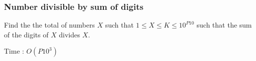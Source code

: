 \subsubsection{Number divisible by sum of digits}

Find the the total of numbers $X$ such that $1 \leq X \leq K \leq 10^{P10}$ such that the sum of the digits of $X$  divides $X$.

Time : $O(P10^{3})$
